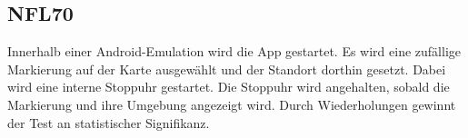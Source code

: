 \subsection*{NFL70}

Innerhalb einer Android-Emulation wird die App gestartet.
Es wird eine zufällige Markierung auf der Karte ausgewählt und der Standort dorthin gesetzt. 
Dabei wird eine interne Stoppuhr gestartet.
Die Stoppuhr wird angehalten, sobald die Markierung und ihre Umgebung angezeigt wird.
Durch Wiederholungen gewinnt der Test an statistischer Signifikanz.
